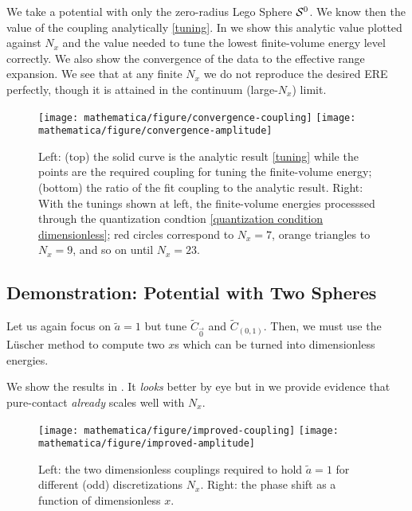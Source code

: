 We take a potential with only the zero-radius Lego Sphere $\mathcal{S}^{0}$.
We know then the value of the coupling analytically \eqref{tuning}.
In  we show this analytic value plotted against $N_x$ and the value needed to tune the lowest finite-volume energy level correctly.
We also show the convergence of the data to the effective range expansion.
We see that at any finite $N_x$ we do not reproduce the desired ERE perfectly, though it is attained in the continuum (large-$N_x$) limit.

\begin{figure}
	\texttt{[image: mathematica/figure/convergence-coupling]}
	\texttt{[image: mathematica/figure/convergence-amplitude]}
	\caption{
		Left:
			(top) the solid curve is the analytic result \eqref{tuning} while the points are the required coupling for tuning the finite-volume energy;
			(bottom) the ratio of the fit coupling to the analytic result.
		Right:
			With the tunings shown at left, the finite-volume energies processsed through the quantization condtion \eqref{quantization condition dimensionless}; red circles correspond to $N_x=7$, orange triangles to $N_x=9$, and so on until $N_x=23$.
	}
	\label{fig:convergence contact}
\end{figure}

\subsection{Demonstration: Potential with Two Spheres}

Let us again focus on $\tilde{a} = 1$ but tune $\tilde{C}_{\vec{0}}$ and $\tilde{C}_{(0,1)}$.
Then, we must use the L\"{u}scher method to compute two $x$s which can be turned into dimensionless energies.

We show the results in .
It \emph{looks} better by eye but in  we provide evidence that pure-contact \emph{already} scales well with $N_x$.

\begin{figure}
	\texttt{[image: mathematica/figure/improved-coupling]}
	\texttt{[image: mathematica/figure/improved-amplitude]}
	\caption{
		Left: the two dimensionless couplings required to hold $\tilde{a}=1$ for different (odd) discretizations $N_x$.
		Right: the phase shift as a function of dimensionless $x$.
	}
    \label{fig:tune two spheres}
\end{figure}

